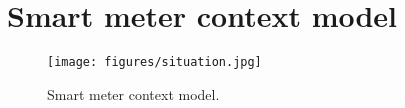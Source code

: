 \section{Smart meter context model}
\begin{figure}
  \texttt{[image: figures/situation.jpg]}
  \caption{Smart meter context model.}
  
\end{figure}



